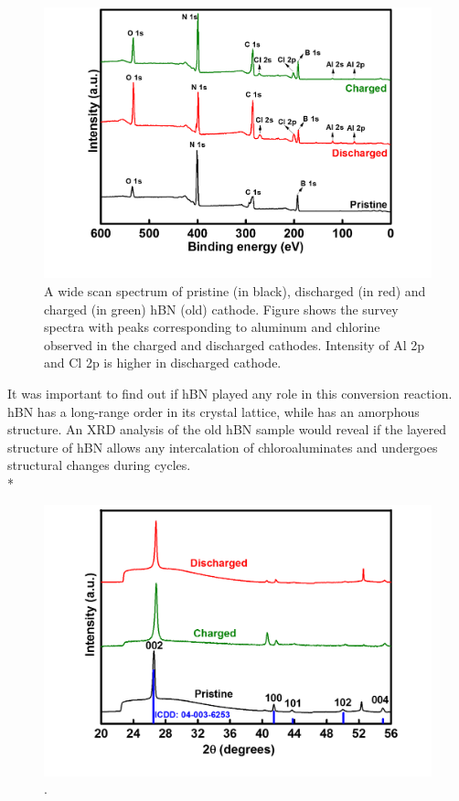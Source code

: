 \begin{figure}[tbh!]
\centering
\includegraphics[width=\textwidth]{Figures/BOhBN/hBNXPS}
\caption{A wide scan spectrum of pristine (in black), discharged (in red) and charged (in green) hBN (old) cathode. Figure shows the survey spectra with peaks corresponding to aluminum and chlorine observed in the charged and discharged cathodes. Intensity of Al 2p and Cl 2p is higher in discharged cathode.}
\label{Figures/BOhBN:hBNXPS}
\end{figure}

It was important to find out if hBN played any role in this conversion reaction. hBN has a long-range order in its crystal lattice, while  has an amorphous structure. An XRD analysis of the old hBN sample would reveal if the layered structure of hBN allows any intercalation of chloroaluminates and undergoes structural changes during cycles. \\*


\begin{figure}[tbh!]
\centering
\includegraphics[width=\textwidth]{Figures/BOhBN/hBNXRD2}
\caption{.}
\label{Figures/BOhBN:hBNXRD2}
\end{figure}

